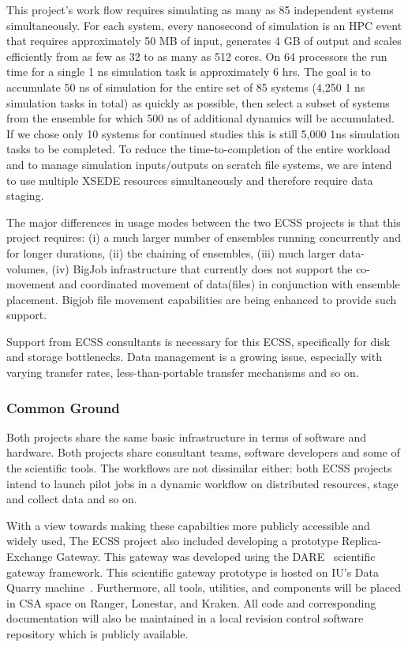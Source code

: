 \documentclass{sig-alternate}
\begin{document}
This project's work flow requires simulating as many as 85 independent systems
simultaneously. For each system, every nanosecond of simulation is an HPC event
that requires approximately 50 MB of input, generates 4 GB of output and scales
efficiently from as few as 32 to as many as 512 cores. On 64 processors the run
time for a single 1 ns simulation task is approximately 6 hrs. The goal is to
accumulate 50 ns of simulation for the entire set of 85 systems (4,250 1 ns
simulation tasks in total) as quickly as possible, then select a subset of
systems from the ensemble for which 500 ns of additional dynamics will be
accumulated. If we chose only 10 systems for continued studies this is still
5,000 1ns simulation tasks to be completed. To reduce the time-to-completion of
the entire workload and to manage simulation inputs/outputs on scratch file
systems, we are intend to use multiple XSEDE resources simultaneously and
therefore require data staging.

The major differences in usage modes between the two ECSS projects is that this
project requires: (i) a much larger number of ensembles running concurrently and
for longer durations, (ii) the chaining of ensembles, (iii) much larger
data-volumes, (iv)  BigJob infrastructure that currently does not support the
co-movement and coordinated movement of data(files) in conjunction with ensemble
placement. Bigjob file movement capabilities are being enhanced to provide
such support.

Support from ECSS consultants is necessary for this ECSS, specifically for disk
and storage bottlenecks. Data management is a growing issue, especially with
varying transfer rates, less-than-portable transfer mechanisms and so on.

\subsubsection{Common Ground}

Both projects share the same basic infrastructure in terms of software and
hardware. Both projects share consultant teams, software developers and some of
the scientific tools. The workflows are not dissimilar either: both ECSS
projects intend to launch pilot jobs in a dynamic workflow on distributed
resources, stage and collect data and so on.

With a view towards making these capabilties more publicly accessible and
widely used, The ECSS project also included developing a prototype
Replica-Exchange Gateway. This gateway was developed using the DARE~\cite{DARE}
scientific gateway framework. This scientific gateway prototype is hosted
on IU's Data Quarry machine~\cite{DataQuarry}. Furthermore, all tools,
utilities, and components will be placed in CSA space on Ranger,
Lonestar, and Kraken. All code and corresponding documentation will also be
maintained in a local revision control software repository which is publicly
available.
\end{document}
